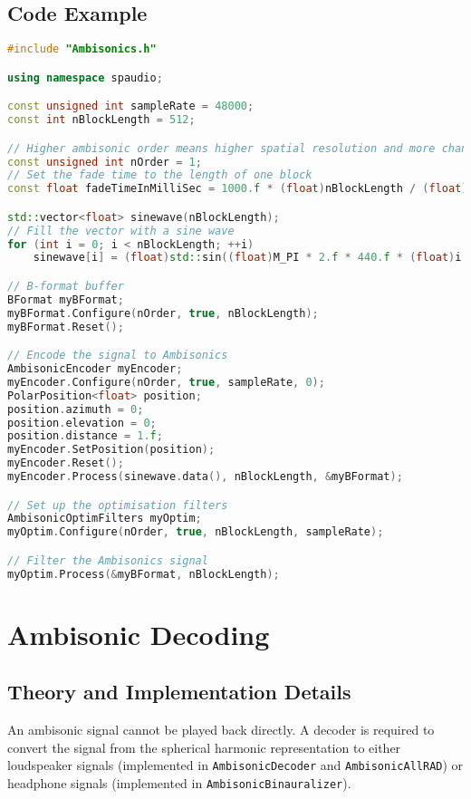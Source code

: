 \documentclass[12pt]{report}
\newcommand{\code}[1]{\texttt{#1}}
\begin{document}
\subsection{Code Example}
\begin{lstlisting}[language=C++]
#include "Ambisonics.h"

using namespace spaudio;

const unsigned int sampleRate = 48000;
const int nBlockLength = 512;

// Higher ambisonic order means higher spatial resolution and more channels required
const unsigned int nOrder = 1;
// Set the fade time to the length of one block
const float fadeTimeInMilliSec = 1000.f * (float)nBlockLength / (float)sampleRate;

std::vector<float> sinewave(nBlockLength);
// Fill the vector with a sine wave
for (int i = 0; i < nBlockLength; ++i)
    sinewave[i] = (float)std::sin((float)M_PI * 2.f * 440.f * (float)i / (float)sampleRate);

// B-format buffer
BFormat myBFormat;
myBFormat.Configure(nOrder, true, nBlockLength);
myBFormat.Reset();

// Encode the signal to Ambisonics
AmbisonicEncoder myEncoder;
myEncoder.Configure(nOrder, true, sampleRate, 0);
PolarPosition<float> position;
position.azimuth = 0;
position.elevation = 0;
position.distance = 1.f;
myEncoder.SetPosition(position);
myEncoder.Reset();
myEncoder.Process(sinewave.data(), nBlockLength, &myBFormat);

// Set up the optimisation filters
AmbisonicOptimFilters myOptim;
myOptim.Configure(nOrder, true, nBlockLength, sampleRate);

// Filter the Ambisonics signal
myOptim.Process(&myBFormat, nBlockLength);
\end{lstlisting}

\section{Ambisonic Decoding}\label{AmbiDecoding}

\subsection{Theory and Implementation Details}
An ambisonic signal cannot be played back directly.
A decoder is required to convert the signal from the spherical harmonic representation to either loudspeaker signals (implemented in \code{AmbisonicDecoder} and \code{AmbisonicAllRAD}) or headphone signals (implemented in \code{AmbisonicBinauralizer}).
\end{document}
